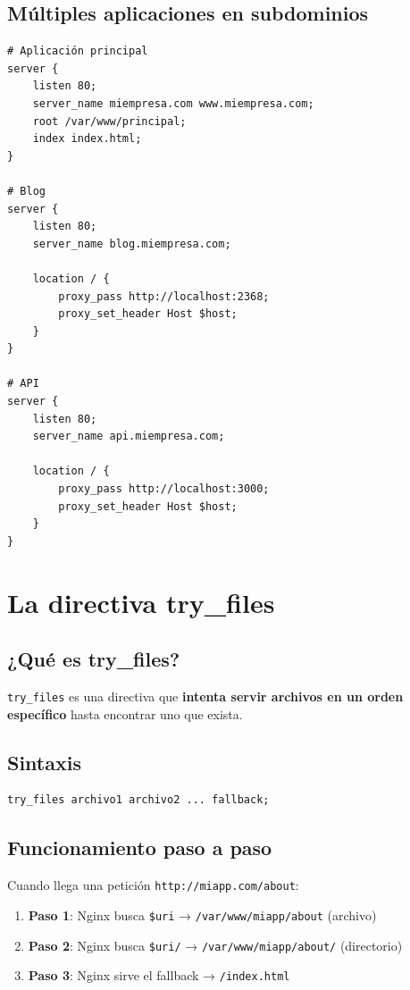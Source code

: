 \documentclass[11pt,a4paper]{article}
\begin{document}
\subsection{Múltiples aplicaciones en subdominios}

\begin{lstlisting}[caption=Multi-sitio con subdominios]
# Aplicación principal
server {
    listen 80;
    server_name miempresa.com www.miempresa.com;
    root /var/www/principal;
    index index.html;
}

# Blog
server {
    listen 80;
    server_name blog.miempresa.com;
    
    location / {
        proxy_pass http://localhost:2368;
        proxy_set_header Host $host;
    }
}

# API
server {
    listen 80;
    server_name api.miempresa.com;
    
    location / {
        proxy_pass http://localhost:3000;
        proxy_set_header Host $host;
    }
}
\end{lstlisting}

\section{La directiva try\_files}

\subsection{¿Qué es try\_files?}

\texttt{try\_files} es una directiva que \textbf{intenta servir archivos en un orden específico} hasta encontrar uno que exista.

\subsection{Sintaxis}
\begin{lstlisting}
try_files archivo1 archivo2 ... fallback;
\end{lstlisting}

\subsection{Funcionamiento paso a paso}

Cuando llega una petición \texttt{http://miapp.com/about}:

\begin{enumerate}
    \item \textbf{Paso 1}: Nginx busca \texttt{\$uri} → \texttt{/var/www/miapp/about} (archivo)
    \item \textbf{Paso 2}: Nginx busca \texttt{\$uri/} → \texttt{/var/www/miapp/about/} (directorio)
    \item \textbf{Paso 3}: Nginx sirve el fallback → \texttt{/index.html}
\end{enumerate}
\end{document}

